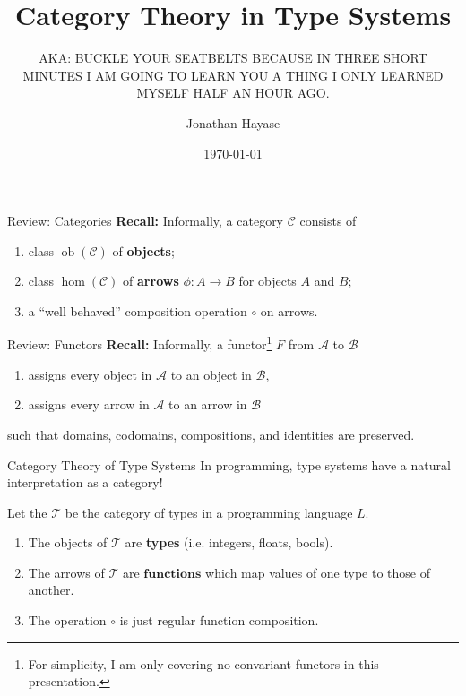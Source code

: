 \documentclass[10pt]{beamer}
\title{Category Theory in Type Systems}
\subtitle{AKA: BUCKLE YOUR SEATBELTS BECAUSE IN THREE SHORT MINUTES I AM GOING TO LEARN YOU A THING I ONLY LEARNED MYSELF HALF AN HOUR AGO.}
\date{\today}
\author{Jonathan Hayase}
\institute{Math 171 -- Abstract Algebra -- Spring 2018}
\DeclareMathOperator{\ob}{ob}
\begin{document}
\maketitle

\begin{frame}{Review: Categories}
  \textbf{Recall:}
  Informally, a category \(\mathcal{C}\) consists of
  \begin{enumerate}
  \item class \(\ob(\mathcal C)\) of \textbf{objects};
  \item class \(\hom(\mathcal C)\) of \textbf{arrows} \(\phi: A \to B\) for objects \(A\) and \(B\);
  \item a ``well behaved'' composition operation \(\circ\) on arrows.
  \end{enumerate}
\end{frame}

\begin{frame}{Review: Functors}
  \textbf{Recall:}
  Informally, a functor\footnote{For simplicity, I am only covering no convariant functors in this presentation.} \(F\) from \(\mathcal A\) to \(\mathcal B\)
  \begin{enumerate}
  \item assigns every object in \(\mathcal A\) to an object in \(\mathcal B\),
  \item assigns every arrow in \(\mathcal A\) to an arrow in \(\mathcal B\)
  \end{enumerate}
  such that domains, codomains, compositions, and identities are preserved.
\end{frame}

\begin{frame}{Category Theory of Type Systems}
  In programming, type systems have a natural interpretation as a category!

  Let the \(\mathcal{T}\) be the category of types in a programming language \(L\).
  \begin{enumerate}
  \item The objects of \(\mathcal T\) are \textbf{types} (i.e. integers, floats, bools).
  \item The arrows of \(\mathcal T\) are \(\mathbf{functions}\) which map values of one type to those of another.
  \item The operation \(\circ\) is just regular function composition.
  \end{enumerate}
\end{frame}
\end{document}
